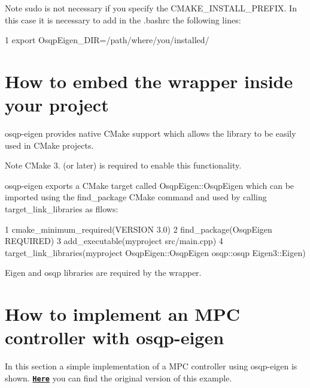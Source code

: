 \begin{DoxyNote}{Note}
{\ttfamily sudo} is not necessary if you specify the {\ttfamily C\+M\+A\+K\+E\+\_\+\+I\+N\+S\+T\+A\+L\+L\+\_\+\+P\+R\+E\+F\+IX}. In this case it is necessary to add in the {\ttfamily .bashrc} the following lines\+: 
\begin{DoxyCode}
1 export OsqpEigen\_DIR=/path/where/you/installed/
\end{DoxyCode}

\end{DoxyNote}
\hypertarget{index_use-section}{}\section{How to embed the wrapper inside your project}\label{index_use-section}
osqp-\/eigen provides native C\+Make support which allows the library to be easily used in C\+Make projects. \begin{DoxyNote}{Note}
C\+Make 3. (or later) is required to enable this functionality.
\end{DoxyNote}
osqp-\/eigen exports a C\+Make target called {\ttfamily Osqp\+Eigen\+::\+Osqp\+Eigen} which can be imported using the {\ttfamily find\+\_\+package} C\+Make command and used by calling {\ttfamily target\+\_\+link\+\_\+libraries} as fllows\+: 
\begin{DoxyCode}
1 cmake\_minimum\_required(VERSION 3.0)
2 find\_package(OsqpEigen REQUIRED)
3 add\_executable(myproject src/main.cpp)
4 target\_link\_libraries(myproject OsqpEigen::OsqpEigen osqp::osqp Eigen3::Eigen)
\end{DoxyCode}
 Eigen and osqp libraries are required by the wrapper.\hypertarget{index_example-section}{}\section{How to implement an M\+P\+C controller with osqp-\/eigen}\label{index_example-section}
In this section a simple implementation of a M\+PC controller using osqp-\/eigen is shown. \href{http://osqp.readthedocs.io/en/latest/examples/mpc.html}{\tt {\bfseries Here}} you can find the original version of this example.

